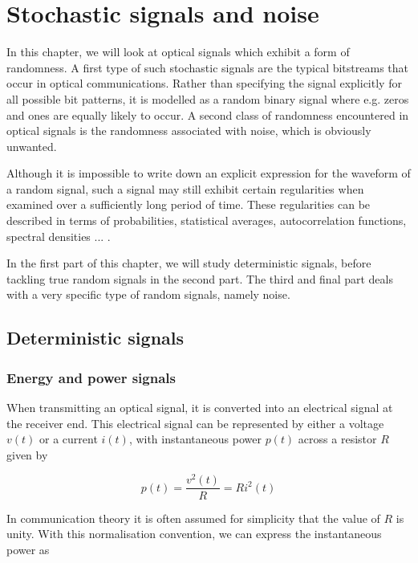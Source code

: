 \setcounter{chapter}{5} %

\chapter{Stochastic signals and noise}
\label{h:stochastic}

\minitoc

In this chapter, we will look at optical signals which exhibit a form of randomness. A first type of such stochastic signals are the typical bitstreams that occur in optical communications. Rather than specifying the signal explicitly for all possible bit patterns, it is modelled as a random binary signal where e.g. zeros and ones are equally likely to occur. A second class of randomness encountered in optical signals is the randomness associated with noise, which is obviously unwanted.

Although it is impossible to write down an explicit expression for the waveform of a random signal, such a signal may still exhibit certain regularities when examined over a sufficiently long period of time. These regularities can be described in terms of probabilities, statistical averages, autocorrelation functions, spectral densities ... .

In the first part of this chapter, we will study deterministic signals, before tackling true random signals in the second part. The third and final part deals with a very specific type of random signals, namely noise.
 
\section{Deterministic signals}

\subsection{Energy and power signals}

When transmitting an optical signal, it is converted into an electrical signal at the receiver end. This electrical signal can be represented by either a voltage $v(t)$ or a current $i(t)$, with instantaneous power $p(t)$ across a resistor $R$ given by

\begin{equation}
p(t) = \frac{v^2(t)}{R} = R i^2(t)
\end{equation} 

In communication theory it is often assumed for simplicity that the value of $R$ is unity. With this normalisation convention, we can express the instantaneous power as

